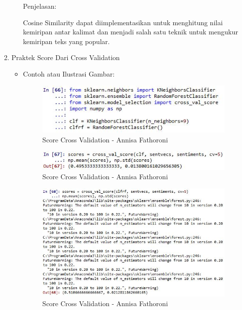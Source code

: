 \begin{enumerate}
\begin{itemize}
Penjelasan: 

Cosine Similarity dapat diimplementasikan untuk menghitung nilai kemiripan antar kalimat dan menjadi salah satu teknik untuk mengukur kemiripan  teks yang  popular. 

\end{itemize}

\item Praktek Score Dari Cross Validation
\begin{itemize}
\item Contoh atau Ilustrasi Gambar:

\begin{figure}[!hbtp]
\centering
\includegraphics[scale=0.7]{figures/Chapter5AnnisaFathoroni56.jpg}
\caption{Score Cross Validation - Annisa Fathoroni}
\label{Score Cross Validation - Annisa Fathoroni}
\end{figure}

\begin{figure}[!hbtp]
\centering
\includegraphics[scale=0.7]{figures/Chapter5AnnisaFathoroni57.jpg}
\caption{Score Cross Validation - Annisa Fathoroni}
\label{Score Cross Validation - Annisa Fathoroni}
\end{figure}

\begin{figure}[!hbtp]
\centering
\includegraphics[scale=0.7]{figures/Chapter5AnnisaFathoroni58.jpg}
\caption{Score Cross Validation - Annisa Fathoroni}
\label{Score Cross Validation - Annisa Fathoroni}
\end{figure}


\end{itemize}
\end{enumerate}
